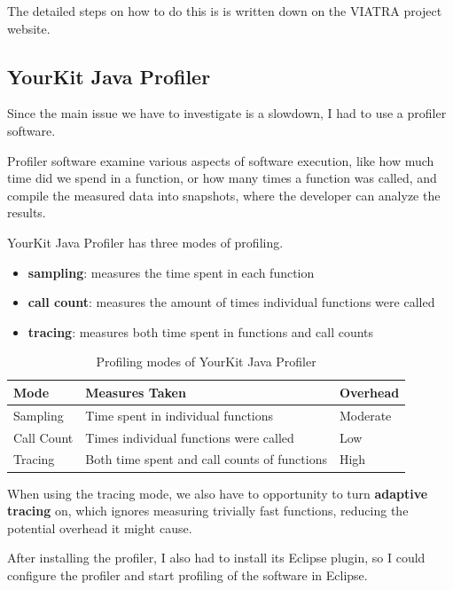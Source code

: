 \documentclass[11pt,a4paper,oneside]{report}
\begin{document}
The detailed steps on how to do this is is written down on the VIATRA project
website.

\subsection{YourKit Java Profiler}
Since the main issue we have to investigate is a slowdown, I had to use a
profiler software.

Profiler software examine various aspects of software execution, like how much
time did we spend in a function, or how many times a function was called, and
compile the measured data into snapshots, where the developer can analyze the
results.

YourKit Java Profiler has three modes of profiling.
\begin{itemize}
    \item{\textbf{sampling}: measures the time spent in each function}
    \item{\textbf{call count}: measures the amount of times individual functions were called}
    \item{\textbf{tracing}: measures both time spent in functions and call counts}
\end{itemize}

\begin{table}[ht]
    \footnotesize
    \centering
    \begin{tabular}{ l l l }
        \toprule
        Mode & Measures Taken & Overhead \\
        \midrule
        Sampling & Time spent in individual functions & Moderate \\
        Call Count & Times individual functions were called & Low \\
        Tracing & Both time spent and call counts of functions & High \\
        \bottomrule
    \end{tabular}
    \caption{Profiling modes of YourKit Java Profiler}
    \label{tab:profiler-modes}
\end{table}

When using the tracing mode, we also have to opportunity to turn
\textbf{adaptive tracing} on, which ignores measuring trivially fast functions,
reducing the potential overhead it might cause.

After installing the profiler, I also had to install its Eclipse plugin, so I
could configure the profiler and start profiling of the software in Eclipse.
\end{document}
